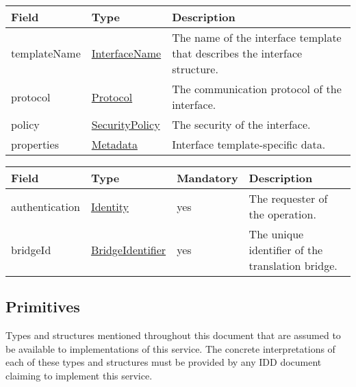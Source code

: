 \documentclass[a4paper]{arrowhead}
\newcommand{\pref}[1]{{\textcolor{ArrowheadGrey}{\hyperref[sec:model:primitives:#1]{#1}}}}
\begin{document}

\begin{table}[ht!]
\begin{tabularx}{\textwidth}{| p{3.9cm} | p{4cm} | X |} \hline
\rowcolor{gray!33} Field & Type & Description \\ \hline
templateName & \pref{InterfaceName} & The name of the interface template that describes the interface structure. \\ \hline
protocol & \pref{Protocol} & The communication protocol of the interface. \\ \hline
policy & \pref{SecurityPolicy} & The security of the interface. \\ \hline
properties &\hyperref[sec:model:Metadata]{Metadata} & Interface template-specific data. \\ \hline
\end{tabularx}
\end{table}

 
\begin{table}[ht!]
\begin{tabularx}{\textwidth}{| p{3.9cm} | p{5.5cm} | p{2cm} | X |} \hline
\rowcolor{gray!33} Field & Type & Mandatory & Description \\ \hline
authentication & \hyperref[sec:model:Identity]{Identity} & yes & The requester of the operation. \\ \hline
bridgeId & \pref{BridgeIdentifier} & yes & The unique identifier of the translation bridge. \\ \hline
\end{tabularx}
\end{table}

\subsection{Primitives}
\label{sec:model:primitives}

Types and structures mentioned throughout this document that are assumed to be available to implementations of this service.
The concrete interpretations of each of these types and structures must be provided by any IDD document claiming to implement this service.
\end{document}
